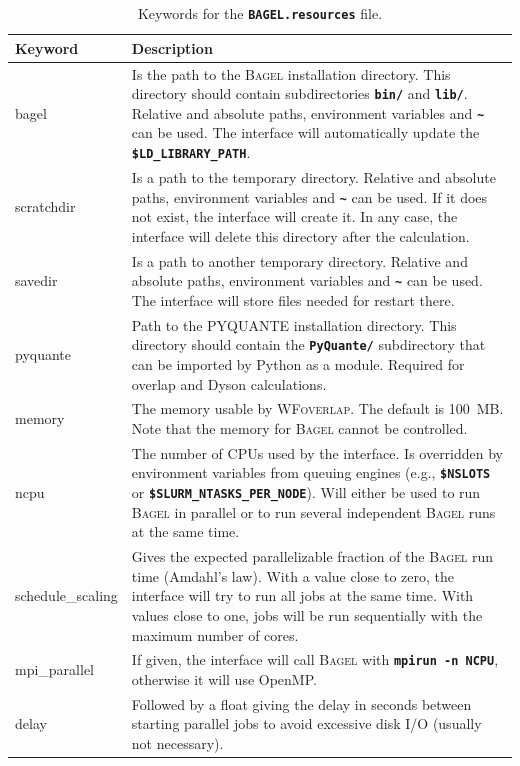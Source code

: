 \documentclass[a4paper,10pt,DIV=15,openany]{scrbook}
\newcommand{\ttt}[1]{\textbf{\texttt{#1}}}
\begin{document}
\begin{table}
  \centering
  \caption{Keywords for the \ttt{BAGEL.resources} file.}
  \label{tab:bagel_sh2}
  \begin{tabular}{>{\ttfamily}lp{12cm}}
  \hline
  Keyword       &Description\\
  \hline
bagel                   &Is the path to the \textsc{Bagel} installation directory. This directory should contain subdirectories \ttt{bin/} and \ttt{lib/}. Relative and absolute paths, environment variables and \ttt{\textasciitilde} can be used. The interface will automatically update the \ttt{\$LD\_LIBRARY\_PATH}. 
\\
scratchdir              &Is a path to the temporary directory. Relative and absolute paths, environment variables and \ttt{\textasciitilde} can be used. If it does not exist, the interface will create it. In any case, the interface will delete this directory after the calculation. 
\\
savedir                 &Is a path to another temporary directory.  Relative and absolute paths, environment variables and \ttt{\textasciitilde} can be used. The interface will store files needed for restart there.
\\
pyquante                &Path to the PYQUANTE installation directory. This directory should contain the \ttt{PyQuante/} subdirectory that can be imported by Python as a module. Required for overlap and Dyson calculations.
\\
memory                  &The memory usable by \textsc{WFoverlap}. The default is 100~MB. Note that the memory for \textsc{Bagel} cannot be controlled.
\\
ncpu                    &The number of CPUs used by the interface. Is overridden by environment variables from queuing engines (e.g., \ttt{\$NSLOTS} or \ttt{\$SLURM\_NTASKS\_PER\_NODE}). Will either be used to run \textsc{Bagel} in parallel or to run several independent \textsc{Bagel} runs at the same time.
\\
schedule\_scaling       &Gives the expected parallelizable fraction of the \textsc{Bagel} run time (Amdahl's law). With a value close to zero, the interface will try to run all jobs at the same time. With values close to one, jobs will be run sequentially with the maximum number of cores.
\\
mpi\_parallel                     &If given, the interface will call \textsc{Bagel} with \ttt{mpirun -n NCPU}, otherwise it will use OpenMP.
\\
delay                   &Followed by a float giving the delay in seconds between starting parallel jobs to avoid excessive disk I/O (usually not necessary).

\end{tabular}
\end{table}
\end{document}
